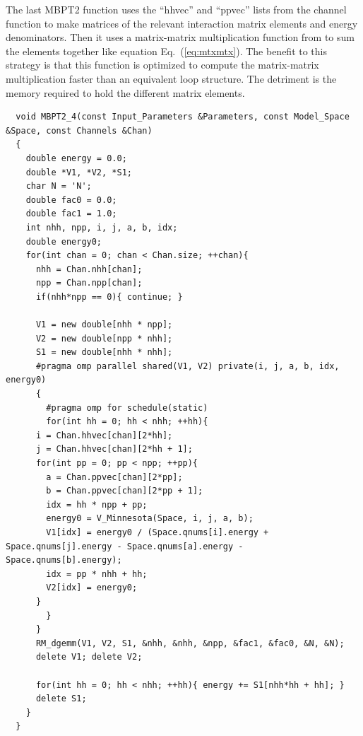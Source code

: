 The last MBPT2 function uses the ``hhvec'' and ``ppvec'' lists from the channel function to make matrices of the relevant interaction matrix elements and energy denominators. Then it uses a matrix-matrix multiplication function from \cite{blas} to sum the elements together like equation Eq.~(\ref{eq:mtxmtx}). The benefit to this strategy is that this function is optimized to compute the matrix-matrix multiplication faster than an equivalent loop structure. The detriment is the memory required to hold the different matrix elements.

\begin{lstlisting}
  void MBPT2_4(const Input_Parameters &Parameters, const Model_Space &Space, const Channels &Chan)
  {
    double energy = 0.0;
    double *V1, *V2, *S1;
    char N = 'N';
    double fac0 = 0.0;
    double fac1 = 1.0;
    int nhh, npp, i, j, a, b, idx;
    double energy0;
    for(int chan = 0; chan < Chan.size; ++chan){
      nhh = Chan.nhh[chan];
      npp = Chan.npp[chan];
      if(nhh*npp == 0){ continue; }
      
      V1 = new double[nhh * npp];
      V2 = new double[npp * nhh];
      S1 = new double[nhh * nhh];
      #pragma omp parallel shared(V1, V2) private(i, j, a, b, idx, energy0)
      {
        #pragma omp for schedule(static)
        for(int hh = 0; hh < nhh; ++hh){
	  i = Chan.hhvec[chan][2*hh];
	  j = Chan.hhvec[chan][2*hh + 1];
	  for(int pp = 0; pp < npp; ++pp){
	    a = Chan.ppvec[chan][2*pp];
	    b = Chan.ppvec[chan][2*pp + 1];
	    idx = hh * npp + pp;
	    energy0 = V_Minnesota(Space, i, j, a, b);
	    V1[idx] = energy0 / (Space.qnums[i].energy + Space.qnums[j].energy - Space.qnums[a].energy - Space.qnums[b].energy);
	    idx = pp * nhh + hh;
	    V2[idx] = energy0;
	  }
        }
      } 
      RM_dgemm(V1, V2, S1, &nhh, &nhh, &npp, &fac1, &fac0, &N, &N);
      delete V1; delete V2;
      
      for(int hh = 0; hh < nhh; ++hh){ energy += S1[nhh*hh + hh]; }
      delete S1;
    }
  }
\end{lstlisting}

